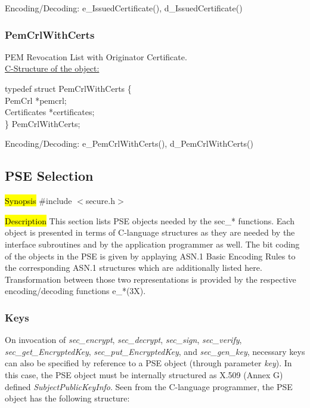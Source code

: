 Encoding/Decoding: e\_IssuedCertificate(), d\_IssuedCertificate()

\subsubsection{PemCrlWithCerts}
PEM Revocation List with Originator Certificate. \\
\underline{C-Structure of the object:}

{\small
\btab
\1      typedef struct PemCrlWithCerts \{ \\
\2              PemCrl  \2          *pemcrl; \\
\2              Certificates \2  *certificates; \\
\1       \} PemCrlWithCerts; \\
\etab
}

Encoding/Decoding: e\_PemCrlWithCerts(), d\_PemCrlWithCerts()



\subsection{PSE Selection}
\label{cc_sel}
\label{sec-sw-cc}
\hl{Synopsis}
\#include $<$secure.h$>$ 

\hl{Description}     
This section lists PSE objects needed by the sec\_* functions. Each object is presented in terms
of C-language structures as they are needed by the interface subroutines and
by the application programmer as well. The bit coding of the objects in the PSE
is given by applaying ASN.1 Basic Encoding Rules to the corresponding ASN.1 structures which
are additionally listed here.
Transformation between those two representations
is provided by the respective encoding/decoding functions e\_*(3X).

\subsubsection{Keys}
On invocation of {\em sec\_encrypt}, {\em sec\_decrypt}, {\em sec\_sign}, {\em sec\_verify},
{\em sec\_get\_EncryptedKey}, {\em sec\_put\_EncryptedKey}, and {\em sec\_gen\_key}, necessary
keys can also be specified by reference to a PSE object (through parameter {\em key}). In this
case, the PSE object must be internally structured as X.509 (Annex G) defined
{\em SubjectPublicKeyInfo}. Seen from the C-language programmer, the PSE object 
has the following structure:
       
